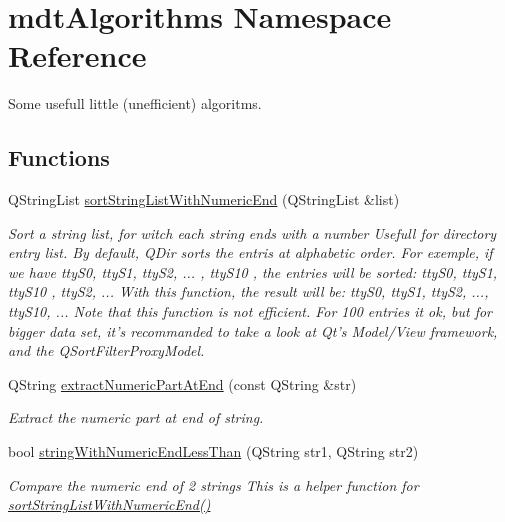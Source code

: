 \hypertarget{namespacemdt_algorithms}{
\section{mdtAlgorithms Namespace Reference}
\label{namespacemdt_algorithms}
}


Some usefull little (unefficient) algoritms.  


\subsection*{Functions}
\begin{DoxyCompactItemize}
\item 
QStringList \hyperlink{namespacemdt_algorithms_a1a3e54a0c5c508c2ea531c7c6200588e}{sortStringListWithNumericEnd} (QStringList \&list)
\begin{DoxyCompactList}\small\item\em Sort a string list, for witch each string ends with a number Usefull for directory entry list. By default, QDir sorts the entris at alphabetic order. For exemple, if we have ttyS0, ttyS1, ttyS2, ... , ttyS10 , the entries will be sorted: ttyS0, ttyS1, ttyS10 , ttyS2, ... With this function, the result will be: ttyS0, ttyS1, ttyS2, ..., ttyS10, ... Note that this function is not efficient. For 100 entries it ok, but for bigger data set, it's recommanded to take a look at Qt's Model/View framework, and the QSortFilterProxyModel. \end{DoxyCompactList}\item 
QString \hyperlink{namespacemdt_algorithms_adfeb44a0a2a440a6b200ad19db73ac45}{extractNumericPartAtEnd} (const QString \&str)
\begin{DoxyCompactList}\small\item\em Extract the numeric part at end of string. \end{DoxyCompactList}\item 
bool \hyperlink{namespacemdt_algorithms_a11d5a1ebe9a68710e6e78f768ac9203c}{stringWithNumericEndLessThan} (QString str1, QString str2)
\begin{DoxyCompactList}\small\item\em Compare the numeric end of 2 strings This is a helper function for \hyperlink{namespacemdt_algorithms_a1a3e54a0c5c508c2ea531c7c6200588e}{sortStringListWithNumericEnd()} \end{DoxyCompactList}\end{DoxyCompactItemize}


